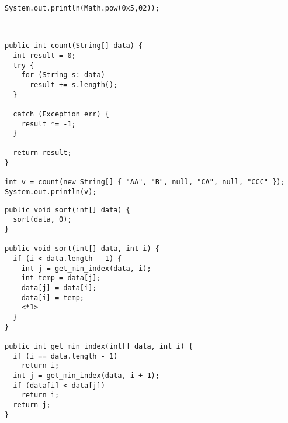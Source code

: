 \documentclass[11pt,addpoints]{exam}
\begin{document}
\begin{questions}
\begin{minipage}{\textwidth}

\begin{verbatim}
System.out.println(Math.pow(0x5,02));
\end{verbatim}

\begin{choices}
   \\
\end{choices}
\end{minipage}

\begin{minipage}{\textwidth}

\begin{verbatim}
public int count(String[] data) {
  int result = 0;
  try {
    for (String s: data)
      result += s.length();
  }

  catch (Exception err) {
    result *= -1;
  }

  return result;
}

int v = count(new String[] { "AA", "B", null, "CA", null, "CCC" });
System.out.println(v);

\end{verbatim}

\begin{choices}
\end{choices}
\end{minipage}

\begin{minipage}{\textwidth}


\begin{verbatim}
public void sort(int[] data) {
  sort(data, 0);
}

public void sort(int[] data, int i) {
  if (i < data.length - 1) {
    int j = get_min_index(data, i);
    int temp = data[j];
    data[j] = data[i];
    data[i] = temp;
    <*1>
  }
}

public int get_min_index(int[] data, int i) {
  if (i == data.length - 1)
    return i;
  int j = get_min_index(data, i + 1);
  if (data[i] < data[j])
    return i;
  return j;
}
\end{verbatim}


\end{minipage}
\end{questions}
\end{document}
